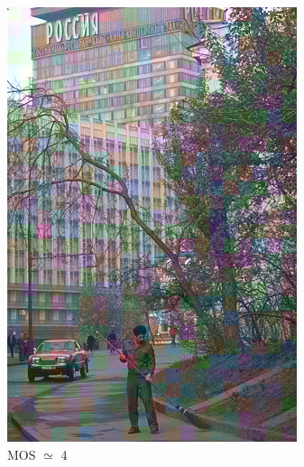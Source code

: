 \documentclass{article}
\begin{document}
\begin{figure}[ht]
\begin{subfigure}{2.9cm}
  \includegraphics[width=0.9\linewidth]{figures/dc_shuffle_xor_chrominance_76_274007}
  \caption{MOS $\simeq$ 4}
  \label{fig:sub2}
\end{subfigure}
\begin{subfigure}{2.9cm}
  \centering

\end{subfigure}
\end{figure}
\end{document}
